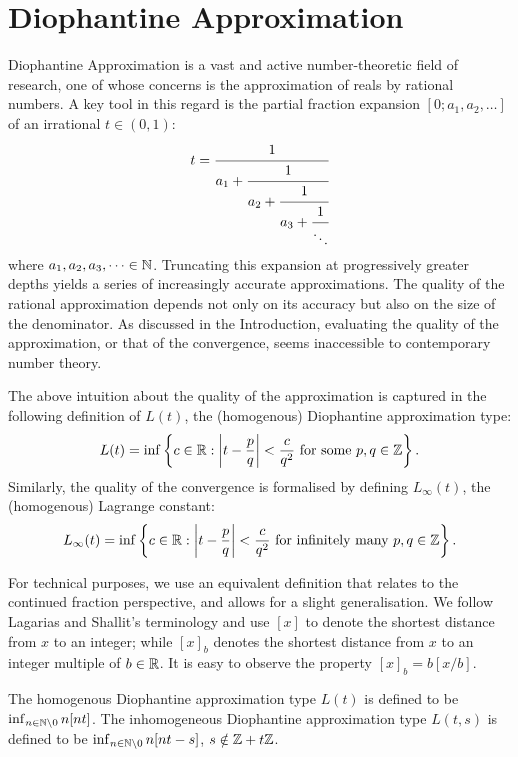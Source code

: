 \section{Diophantine Approximation}
\label{section:diophantine}

Diophantine Approximation is a vast and active number-theoretic field of research, one of whose concerns is the approximation of reals by rational numbers. A key tool in this regard is the partial fraction expansion $[0; a_1, a_2, \dots]$ of an irrational $t \in (0, 1)$:
$$
t = \cfrac{1}{a_1 + \cfrac{1}{a_2 + \cfrac{1}{a_3 + \cfrac{1}{\ddots}}}}
$$
where $a_1, a_2, a_3, \dots \in \mathbb{N}$. Truncating this expansion at progressively greater depths yields a series of increasingly accurate approximations. The quality of the rational approximation depends not only on its accuracy but also on the size of the denominator. As discussed in the Introduction, evaluating the quality of the approximation, or that of the convergence, seems inaccessible to contemporary number theory.

The above intuition about the quality of the approximation is captured in the following definition of $L(t)$, the (homogenous) Diophantine approximation type:
\begin{equation}
L(t) = \inf\left\{c \in \mathbb{R} : \left|t - \frac{p}{q}\right| < \frac{c}{q^2} \text{ for some } p, q\in \mathbb{Z}\right\}.
\end{equation}
Similarly, the quality of the convergence is formalised by defining $L_{\infty}(t)$, the (homogenous) Lagrange constant: 
\begin{equation}
L_\infty(t) = \inf\left\{c \in \mathbb{R} : \left|t - \frac{p}{q}\right| < \frac{c}{q^2} \text{ for infinitely many } p, q\in \mathbb{Z}\right\}.
\end{equation}
 
For technical purposes, we use an equivalent definition that relates to the continued fraction perspective, and allows for a slight generalisation. We follow Lagarias and Shallit’s terminology \cite{dio-constants} and use $[x]$ to denote the shortest distance from $x$ to an integer; while $[x]_b$ denotes the shortest distance from $x$ to an integer multiple of $b \in \mathbb{R}$. It is easy to observe the property $[x]_b = b[x/b]$.

\begin{definition}
\label{def:L}
The homogenous Diophantine approximation type $L(t)$ is defined to be $\inf_{n \in \mathbb{N} \backslash{0}} n[nt]$. The inhomogeneous Diophantine approximation type $L(t, s)$ is defined to be $\inf_{n \in \mathbb{N} \backslash{0}} n[nt - s]$, $s \notin \mathbb{Z} + t\mathbb{Z}$. 
\end{definition} 

